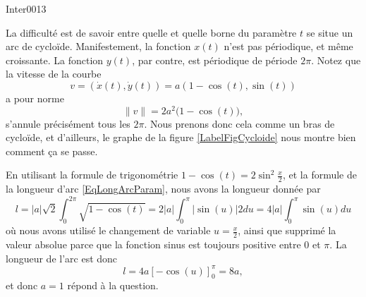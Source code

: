 \begin{corrige}{Inter0013}

La difficulté est de savoir entre quelle et quelle borne du paramètre $t$ se situe un \og arc\fg{} de cycloïde. Manifestement, la fonction $x(t)$ n'est pas périodique, et même croissante. La fonction $y(t)$, par contre, est périodique de période $2\pi$. Notez que la vitesse de la courbe
\begin{equation}
	v=( \dot x(t),\dot y(t) )=a(1-\cos(t),\sin(t))
\end{equation}
a pour norme
\begin{equation}
	\| v \|=2a^2\big( 1-\cos(t) \big),
\end{equation}
s'annule précisément tous les $2\pi$. Nous prenons donc cela comme un bras de cycloïde, et d'ailleurs, le graphe de la figure \ref{LabelFigCycloide} nous montre bien comment ça se passe.

\newcommand{\CaptionFigCycloide}{La cycloïde.}



En utilisant la formule de trigonométrie $1-\cos(t)=2\sin^2\frac{ x }{ 2 }$, et la formule de la longueur d'arc \eqref{EqLongArcParam}, nous avons la longueur donnée par
\begin{equation}
	l=| a |\sqrt{2}\int_0^{2\pi}\sqrt{1-\cos(t)}=2| a |\int_0^{\pi}|\sin(u)|2 du=4| a |\int_0^{\pi}\sin(u) du
\end{equation}
où nous avons utilisé le changement de variable $u=\frac{ x }{ 2 }$, ainsi que supprimé la valeur absolue parce que la fonction sinus est toujours positive entre $0$ et $\pi$. La longueur de l'arc est donc
\begin{equation}
	l=4a\left[ -\cos(u) \right]_0^{\pi}=8a,
\end{equation}
et donc $a=1$ répond à la question.

\end{corrige}
